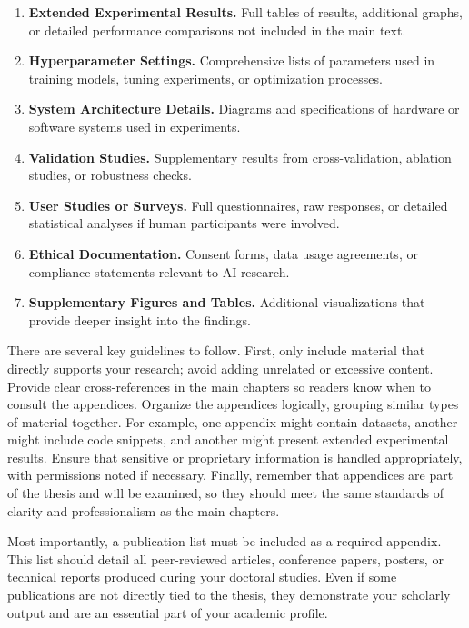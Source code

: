\documentclass[PCOM,Thesis,Review]{mpThesis}
\newcommand{\Hd}[1]{{\color{SteelBlue}\bf#1.}}
\begin{document}
\begin{Appendix}
\begin{Remark}
\begin{enumerate}
\item \Hd{Extended Experimental Results}
Full tables of results, additional graphs, or detailed performance comparisons not included in the main text.

\item \Hd{Hyperparameter Settings}
Comprehensive lists of parameters used in training models, tuning experiments, or optimization processes.

\item \Hd{System Architecture Details}
Diagrams and specifications of hardware or software systems used in experiments.

\item \Hd{Validation Studies}
Supplementary results from cross-validation, ablation studies, or robustness checks.

\item \Hd{User Studies or Surveys}
Full questionnaires, raw responses, or detailed statistical analyses if human participants were involved.

\item \Hd{Ethical Documentation}
Consent forms, data usage agreements, or compliance statements relevant to AI research.

\item \Hd{Supplementary Figures and Tables}
Additional visualizations that provide deeper insight into the findings.
\end{enumerate}

There are several key guidelines to follow.
First, only include material that directly supports your research; avoid adding unrelated or excessive content.
Provide clear cross-references in the main chapters so readers know when to consult the appendices.
Organize the appendices logically, grouping similar types of material together.
For example, one appendix might contain datasets, another might include code snippets, and another might present extended experimental results.
Ensure that sensitive or proprietary information is handled appropriately, with permissions noted if necessary.
Finally, remember that appendices are part of the thesis and will be examined, so they should meet the same standards of clarity and professionalism as the main chapters.

Most importantly, a publication list must be included as a required appendix.
This list should detail all peer-reviewed articles, conference papers, posters, or technical reports produced during your doctoral studies.
Even if some publications are not directly tied to the thesis, they demonstrate your scholarly output and are an essential part of your academic profile.
\end{Remark}


\end{Appendix}
\end{document}
